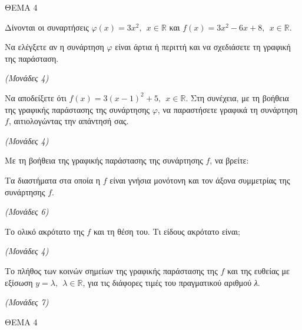 \documentclass[11pt,a4paper,twoside]{book}
\newcommand{\monades}[1]{\hfill \textit{(Μονάδες #1)}}
\begin{document}
\vspace{4mm}

ΘΕΜΑ 4

Δίνονται οι συναρτήσεις $\varphi(x) = 3x^{2},\ \ x \in \mathbb{R}$ και $f(x) = 3x^{2} - 6x + 8,\ \ x\mathbb{\in R}.$

\begin{alist}
\item Να ελέγξετε αν η συνάρτηση $\varphi$ είναι άρτια ή περιττή και να σχεδιάσετε τη γραφική της παράσταση.

\monades{4}

\item Να αποδείξετε ότι $f(x) = 3(x - 1)^{2} + 5,\ \ x\mathbb{\in R}.$ Στη συνέχεια, με τη βοήθεια της γραφικής παράστασης της συνάρτησης $\varphi$, να παραστήσετε γραφικά τη συνάρτηση $f$, αιτιολογώντας την απάντησή σας.

\monades{4}

\item Με τη βοήθεια της γραφικής παράστασης της συνάρτησης $f$, να βρείτε:

\end{alist}
\begin{alist}
\item
  Τα διαστήματα στα οποία η $f$ είναι γνήσια μονότονη και τον άξονα συμμετρίας της συνάρτησης $f.$

\monades{6}


\end{alist}
\begin{alist}
\item
  Το ολικό ακρότατο της $f$ και τη θέση του. Τι είδους ακρότατο είναι;

\monades{4}


\end{alist}
\begin{alist}
\item
  Το πλήθος των κοινών σημείων της γραφικής παράστασης της $f$ και της ευθείας με εξίσωση $y = \lambda,\ \ \lambda\mathbb{\in R}$, για τις διάφορες τιμές του πραγματικού αριθμού \emph{λ}.

\monades{7}
\end{alist}

\vspace{4mm}

ΘΕΜΑ 4
\end{document}
